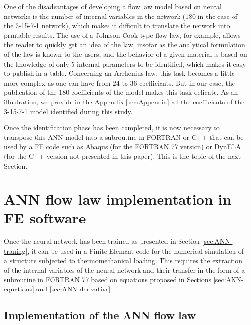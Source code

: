 \documentclass[algorithms,article,submit,pdftex,moreauthors]{Definitions/mdpi}
\begin{document}
One of the disadvantages of developing a flow law model based on neural networks is the number of internal variables in the network ($180$ in the case of the 3-15-7-1 network), which makes it difficult to translate the network into printable results.
The use of a Johnson-Cook type flow law, for example, allows the reader to quickly get an idea of the law, insofar as the analytical formulation of the law is known to the users, and the behavior of a given material is based on the knowledge of only $5$ internal parameters to be identified, which makes it easy to publish in a table.
Concerning an Arrhenius law, this task becomes a little more complex as one can have from $24$ to $36$ coefficients.
But in our case, the publication of the $180$ coefficients of the model makes this task delicate.
As an illustration, we provide in the Appendix \ref{sec:Appendix} all the coefficients of the 3-15-7-1 model identified during this study.

Once the identification phase has been completed, it is now necessary to transpose this ANN model into a subroutine in FORTRAN or C++ that can be used by a FE code such as Abaqus (for the FORTRAN 77 version) or DynELA (for the C++ version not presented in this paper).
This is the topic of the next Section.

\section{ANN flow law implementation in FE software}\label{sec:Use}

Once the neural network has been trained as presented in Section \ref{sec:ANN-traning}, it can be used in a Finite Element code for the numerical simulation of a structure subjected to thermomechanical loading.
This requires the extraction of the internal variables of the neural network and their transfer in the form of a subroutine in FORTRAN 77 based on equations proposed in Sections \ref{sec:ANN-equations} and \ref{sec:ANN-derivative}.

\subsection{Implementation of the ANN flow law}\label{sec:Implementation}
\end{document}
